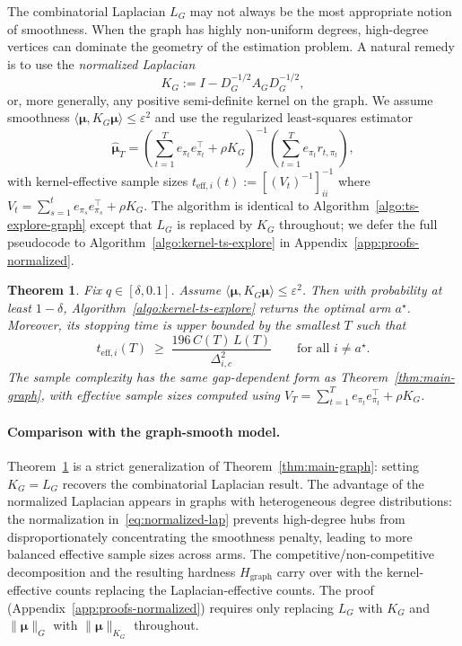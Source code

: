 \documentclass{article}
\newtheorem{theorem}{Theorem}
\begin{document}
The combinatorial Laplacian $L_G$ may not always be the most appropriate notion of smoothness. When the graph has highly non-uniform degrees, high-degree vertices can dominate the geometry of the estimation problem. A natural remedy is to use the \emph{normalized Laplacian} \citep{chung1997spectral}
\begin{equation}
K_G := I - D_G^{-1/2}A_G D_G^{-1/2},
\label{eq:normalized-lap}
\end{equation}
or, more generally, any positive semi-definite kernel on the graph. We assume smoothness $\langle \bm{\mu}, K_G \bm{\mu}\rangle \le \varepsilon^2$ and use the regularized least-squares estimator
\[
\widehat{\bm\mu}_T = \left(\sum_{t=1}^T e_{\pi_t}e_{\pi_t}^\top + \rho K_G\right)^{-1}\left(\sum_{t=1}^T e_{\pi_t}r_{t,\pi_t}\right),
\]
with kernel-effective sample sizes $t_{\mathrm{eff},i}(t) := [(V_t)^{-1}]_{ii}^{-1}$ where $V_t = \sum_{s=1}^t e_{\pi_s}e_{\pi_s}^\top + \rho K_G$. The algorithm is identical to Algorithm~\ref{algo:ts-explore-graph} except that $L_G$ is replaced by $K_G$ throughout; we defer the full pseudocode to Algorithm~\ref{algo:kernel-ts-explore} in Appendix~\ref{app:proofs-normalized}.

\begin{theorem}\label{thm:kernel-ts}
Fix $q\in[\delta,0.1]$. Assume $\langle \bm{\mu},K_G\bm{\mu}\rangle \le \varepsilon^2$.
Then with probability at least $1-\delta$, Algorithm~\ref{algo:kernel-ts-explore} returns the optimal arm $a^\star$. Moreover, its stopping time is upper bounded by the smallest $T$ such that
\[
t_{\mathrm{eff},i}(T)
\;\ge\;
\frac{196\,C(T)\,L(T)}{\Delta_{i,c}^2}
\qquad
\text{for all } i\neq a^\star.
\]
The sample complexity has the same gap-dependent form as Theorem~\ref{thm:main-graph}, with effective sample sizes computed using $V_T = \sum_{t=1}^T e_{\pi_t}e_{\pi_t}^\top + \rho K_G$.
\end{theorem}

\paragraph{Comparison with the graph-smooth model.}
Theorem~\ref{thm:kernel-ts} is a strict generalization of Theorem~\ref{thm:main-graph}: setting $K_G = L_G$ recovers the combinatorial Laplacian result. The advantage of the normalized Laplacian appears in graphs with heterogeneous degree distributions: the normalization in~\eqref{eq:normalized-lap} prevents high-degree hubs from disproportionately concentrating the smoothness penalty, leading to more balanced effective sample sizes across arms. The competitive/non-competitive decomposition and the resulting hardness $H_{\mathrm{graph}}$ carry over with the kernel-effective counts replacing the Laplacian-effective counts. The proof (Appendix~\ref{app:proofs-normalized}) requires only replacing $L_G$ with $K_G$ and $\|\bm\mu\|_G$ with $\|\bm\mu\|_{K_G}$ throughout.
\end{document}
